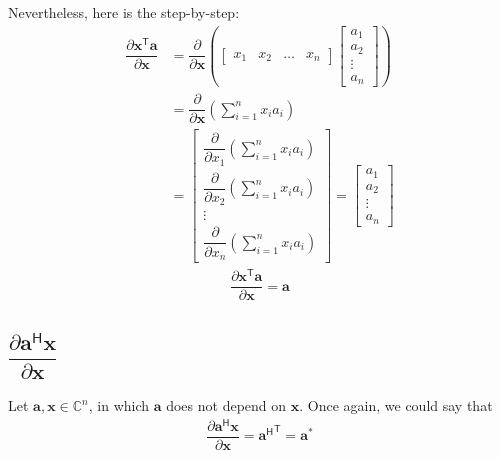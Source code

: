 \documentclass{article}
\newcommand{\trans}{\mathsf{T}}
\newcommand{\hermit}{\mathsf{H}}
\begin{document}
Nevertheless, here is the step-by-step:
\begin{align}
    \dfrac{\partial \mathbf{x}^\trans \mathbf{a}}{\partial \mathbf{x}} &= \dfrac{\partial}{\partial \mathbf{x}} \left(
    \begin{bmatrix}
        x_1 & x_2 & \dots & x_n
    \end{bmatrix} \begin{bmatrix}
        a_{1} \\ a_{2} \\ \vdots \\ a_{n}
    \end{bmatrix} \right) \\
    & = \dfrac{\partial}{\partial \mathbf{x}} \left( \sum_{i = 1}^n x_ia_i \right) \\
    & = \begin{bmatrix}
        \dfrac{\partial}{\partial x_1} \left( \sum_{i = 1}^n x_ia_i \right) \\ \dfrac{\partial}{\partial x_2} \left( \sum_{i = 1}^n x_ia_i \right) \\ \vdots \\ \dfrac{\partial}{\partial x_n} \left( \sum_{i = 1}^n x_ia_i \right) 
    \end{bmatrix} 
    = \begin{bmatrix}
        a_1 \\ a_2 \\ \vdots \\ a_n
    \end{bmatrix}
\end{align}
\begin{align}
    \boxed{\dfrac{\partial \mathbf{x}^\trans \mathbf{a}}{\partial \mathbf{x}} = \mathbf{a}}
\end{align}

\subsection{\(\dfrac{\partial \mathbf{a}^\hermit  \mathbf{x}}{\partial \mathbf{x}}\)}

Let \(\mathbf{a, x} \in \mathbb{C}^{n}\), in which \(\mathbf{a}\) does not depend on \(\mathbf{x}\). Once again, we could say that
\begin{align}
    \dfrac{\partial \mathbf{a}^\hermit \mathbf{x}}{\partial \mathbf{x}} = {\mathbf{a}^\hermit}^\trans = \mathbf{a}^*
\end{align}
\end{document}
